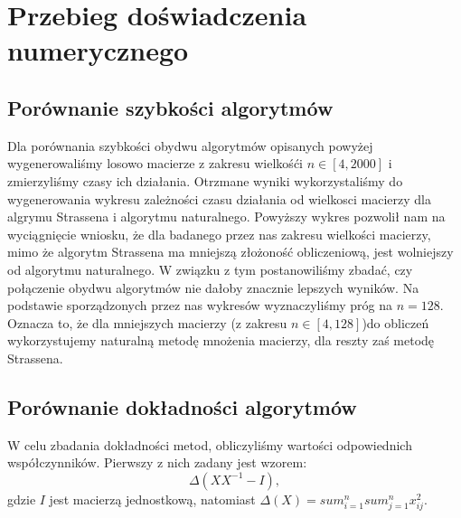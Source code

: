 \section{Przebieg doświadczenia numerycznego}
\subsection{Porównanie szybkości algorytmów}
Dla porównania szybkości obydwu algorytmów opisanych powyżej wygenerowaliśmy
losowo macierze z zakresu wielkośći $n \in [4, 2000]$ i zmierzyliśmy czasy ich
działania. Otrzmane wyniki wykorzystaliśmy do wygenerowania wykresu zależności
czasu działania od wielkosci macierzy dla algrymu Strassena i algorytmu
naturalnego.
Powyższy wykres pozwolił nam na wyciągnięcie wniosku, że dla badanego przez nas
zakresu wielkości macierzy, mimo że algorytm Strassena ma mniejszą złożoność
obliczeniową, jest wolniejszy od algorytmu naturalnego. W związku z tym
postanowiliśmy zbadać, czy połączenie obydwu algorytmów nie dałoby znacznie
lepszych wyników. Na podstawie sporządzonych przez nas wykresów wyznaczyliśmy
próg na $n=128$. Oznacza to, że dla mniejszych macierzy (z zakresu
$n \in [4, 128]$)do obliczeń wykorzystujemy naturalną metodę mnożenia macierzy,
dla reszty zaś metodę Strassena.
\subsection{Porównanie dokładności algorytmów}
W celu zbadania dokładności metod, obliczyliśmy wartości odpowiednich
współczynników. Pierwszy z nich zadany jest wzorem:
$$\Delta(XX^{-1}-I),$$
gdzie $I$ jest macierzą jednostkową, natomiast $\Delta(X) = sum_{i=1}^{n}
sum_{j=1}^{n} x_{ij}^2.$
